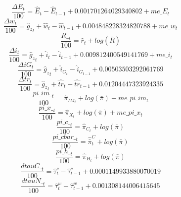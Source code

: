 \begin{dmath}
\frac{{\Delta{E}_{t}}}{100}={\hat{E}_{t}}-{\hat{E}_{t-1}}+0.001701264029340802+{me\_E_{t}}
\end{dmath}
\begin{dmath}
\frac{{\Delta{w}_{t}}}{100}={{\hat{g}_z}_{t}}+{\hat{w}_{t}}-{\hat{w}_{t-1}}+0.004848228324820788+{me\_w_{t}}
\end{dmath}
\begin{dmath}
\frac{{R\__{t}}}{100}={\hat{r}_{t}}+log\left({\bar{R}}\right)
\end{dmath}
\begin{dmath}
\frac{{\Delta{i}_{t}}}{100}={{\hat{g}_z}_{t}}+{\hat{i}_{t}}-{\hat{i}_{t-1}}+0.009812400549141769+{me\_i_{t}}
\end{dmath}
\begin{dmath}
\frac{{\Delta{iG}_{t}}}{100}={{\hat{g}_z}_{t}}+{\hat{i}_G_{t}}-{\hat{i}_G_{t-1}}+0.00503503292061769
\end{dmath}
\begin{dmath}
\frac{{\Delta{tr}_{t}}}{100}={{\hat{g}_z}_{t}}+{\hat{tr}_{t}}-{\hat{tr}_{t-1}}+0.01204447323924335
\end{dmath}
\begin{dmath}
\frac{{pi\_im\__{t}}}{100}={\hat{\pi}_{IM}_{t}}+log\left({\bar{\pi}}\right)+{me\_pi\_im_{t}}
\end{dmath}
\begin{dmath}
\frac{{pi\_x\__{t}}}{100}={\hat{\pi}_{X}_{t}}+log\left({\bar{\pi}}\right)+{me\_pi\_x_{t}}
\end{dmath}
\begin{dmath}
\frac{{pi\_c\__{t}}}{100}={\hat{\pi}_{C}_{t}}+log\left({\bar{\pi}}\right)
\end{dmath}
\begin{dmath}
\frac{{pi\_cbar\__{t}}}{100}={\hat{\bar{\pi}}^C_{t}}+log\left({\bar{\pi}}\right)
\end{dmath}
\begin{dmath}
\frac{{pi\_h\__{t}}}{100}={\hat{\pi}_{H}_{t}}+log\left({\bar{\pi}}\right)
\end{dmath}
\begin{dmath}
\frac{{dtauC\__{t}}}{100}={\hat{\tau}^c_{t}}-{\hat{\tau}^c_{t-1}}+0.0001149933880070019
\end{dmath}
\begin{dmath}
\frac{{dtauN\__{t}}}{100}={\hat{\tau}^w_{t}}-{\hat{\tau}^w_{t-1}}+0.001308144006415645
\end{dmath}
